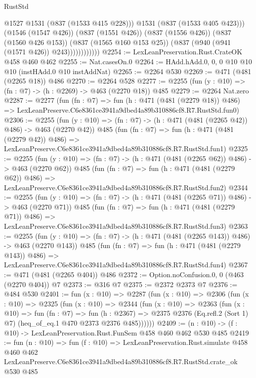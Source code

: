 \begin{lexlean}{RustStd}
\begin{coremodule}
                            @1527
                            @1531
                            (@837 (@1533 @415 @228)))
                          @1531
                          (@837 (@1533 @405 @423)))
                        (@1546 (@1547 @426))
                        (@837 (@1551 @426))
                        (@837 (@1556 @426))
                        (@837 (@1560 @426 @153))
                        (@837 (@1565 @160 @153 @25))
                        (@837 (@940 (@941 (@1571 @426)) @243))))))))))))
@2254 := LexLeanPreservation.Rust.CrateOK @458 @460 @462
@2255 := Nat.casesOn.{0}
@2264 := HAdd.hAdd.{0, 0, 0} @10 @10 @10 (instHAdd.{0} @10 instAddNat)
@2265 := @2264 @530
@2269 := @471 (@481 (@2265 @18)) @486
@2270 := @2264 @528
@2277 := @2255 (fun (y : @10) => (fn : @7) -> (h : @2269) -> @463 (@2270 @18)) @485
@2279 := @2264 Nat.zero
@2287 := @2277
    (fun (fn : @7) =>
    fun (h : @471 (@481 (@2279 @18)) @486) =>
    LexLeanPreserve.C6e8361ce3941a9dbed4a89b310886cf8.R7.RustStd.fun0)
@2306 := @2255
    (fun (y : @10) => (fn : @7) -> (h : @471 (@481 (@2265 @42)) @486) -> @463 (@2270 @42))
    @485
    (fun (fn : @7) =>
    fun (h : @471 (@481 (@2279 @42)) @486) =>
    LexLeanPreserve.C6e8361ce3941a9dbed4a89b310886cf8.R7.RustStd.fun1)
@2325 := @2255
    (fun (y : @10) => (fn : @7) -> (h : @471 (@481 (@2265 @62)) @486) -> @463 (@2270 @62))
    @485
    (fun (fn : @7) =>
    fun (h : @471 (@481 (@2279 @62)) @486) =>
    LexLeanPreserve.C6e8361ce3941a9dbed4a89b310886cf8.R7.RustStd.fun2)
@2344 := @2255
    (fun (y : @10) => (fn : @7) -> (h : @471 (@481 (@2265 @71)) @486) -> @463 (@2270 @71))
    @485
    (fun (fn : @7) =>
    fun (h : @471 (@481 (@2279 @71)) @486) =>
    LexLeanPreserve.C6e8361ce3941a9dbed4a89b310886cf8.R7.RustStd.fun3)
@2363 := @2255
    (fun (y : @10) => (fn : @7) -> (h : @471 (@481 (@2265 @143)) @486) -> @463 (@2270 @143))
    @485
    (fun (fn : @7) =>
    fun (h : @471 (@481 (@2279 @143)) @486) =>
    LexLeanPreserve.C6e8361ce3941a9dbed4a89b310886cf8.R7.RustStd.fun4)
@2367 := @471 (@481 (@2265 @404)) @486
@2372 := Option.noConfusion.{0, 0} (@463 (@2270 @404)) @7
@2373 := @316 @7
@2375 := @2372 @2373 @7
@2376 := @484 @530
@2401 := fun (x : @10) =>
  @2287
    (fun (x : @10) =>
    @2306
      (fun (x : @10) =>
      @2325
        (fun (x : @10) =>
        @2344
          (fun (x : @10) =>
          @2363
            (fun (x : @10) =>
            fun (fn : @7) =>
            fun (h : @2367) =>
            @2375 @2376 (Eq.refl.{2} (Sort 1) @7) (heq_of_eq.{1} @470 @2373 @2376 @485))))))
@2409 := (n : @10) -> (f : @10) -> LexLeanPreservation.Rust.FunSem @458 @460 @462 @530 @485
@2419 := fun (n : @10) =>
  fun (f : @10) =>
  LexLeanPreservation.Rust.simulate
    @458
    @460
    @462
    LexLeanPreserve.C6e8361ce3941a9dbed4a89b310886cf8.R7.RustStd.crate_ok
    @530
    @485
\end{coremodule}
\end{lexlean}
